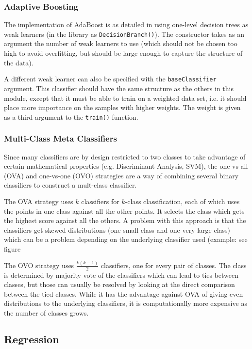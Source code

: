 \documentclass[a4paper]{article}
\begin{document}
\subsubsection{Adaptive Boosting}
The implementation of AdaBoost is as detailed in \cite{PRML} using one-level decision trees as weak learners (in the library as \texttt{DecisionBranch()}). The constructor takes as an argument the number of weak learners to use (which should not be chosen too high to avoid overfitting, but should be large enough to capture the structure of the data).

A different weak learner can also be specified with the \texttt{baseClassifier} argument. This classifier should have the same structure as the others in this module, except that it must be able to train on a weighted data set, i.e. it should place more importance on the samples with higher weights. The weight is given as a third argument to the \texttt{train()} function.

\subsubsection{Multi-Class Meta Classifiers}
Since many classifiers are by design restricted to two classes to take advantage of certain mathematical properties (e.g. Discriminant Analysis, SVM), the one-vs-all (OVA) and one-vs-one (OVO) strategies are a way of combining several binary classifiers to construct a mult-class classifier.

The OVA strategy uses $k$ classifiers for $k$-class classification, each of which uses the points in one class against all the other points. It selects the class which gets the highest score against all the others. A problem with this approach is that the classifiers get skewed distributions (one small class and one very large class) which can be a problem depending on the underlying classifier used (example: see figure %

The OVO strategy uses $\frac{k(k-1)}{2}$ classifiers, one for every pair of classes. The class is determined by majority vote of the classifiers which can lead to ties between classes, but those can usually be resolved by looking at the direct comparison between the tied classes. While it has the advantage against OVA of giving even distributions to the underlying classifiers, it is computationally more expensive as the number of classes grows.


\subsection{Regression}
\end{document}
